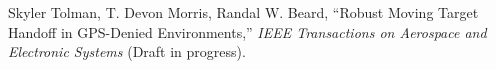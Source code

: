

\begin{cvparagraph}
  Skyler Tolman, T. Devon Morris, Randal W. Beard, ``Robust Moving Target Handoff in GPS-Denied Environments,'' \textit{IEEE Transactions on Aerospace and Electronic Systems} (Draft in progress).
\end{cvparagraph}

